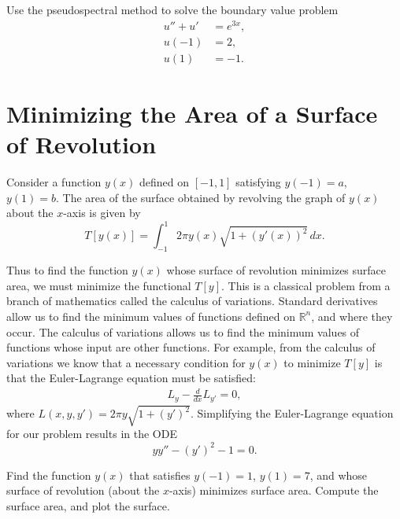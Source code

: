 \begin{problem}
Use the pseudospectral method to solve the boundary value problem 
\begin{align*}
u'' + u' &= e^{3x}, \\
u(-1) &= 2, \\
u(1) &= -1.
\end{align*}
	
\end{problem}





\section*{Minimizing the Area of a Surface of Revolution}
Consider a function $y(x)$ defined on $[-1,1]$ satisfying $y(-1) = a $, $y(1) = b. $ The area of the surface obtained by revolving the graph of $y(x)$ about the $x$-axis is given by 
\[T[y(x)] = \int_{-1}^1 2 \pi y(x) \sqrt{1 + (y'(x))^2}\, dx .\]

Thus to find the function $y(x)$ whose surface of revolution minimizes surface area, we must minimize the functional $T[y]$. 
This is a classical problem from a branch of mathematics called the calculus of variations. 
Standard derivatives allow us to find the minimum values of functions defined on $\mathbb{R}^n$, and where they occur. 
The calculus of variations allows us to find the minimum values of functions whose input are other functions. For example, from the calculus of variations we know that a necessary condition for $y(x)$ to minimize $T[y]$ is that the Euler-Lagrange equation must be satisfied: 
\begin{align*}
	L_y - \frac{d}{dx}L_{y'} = 0,
\end{align*}
where $L(x,y,y') = 2 \pi y \sqrt{1 + (y')^2}$.  Simplifying the Euler-Lagrange equation for our problem results in the ODE
\[y y'' - (y')^2 -1 = 0.\]


\begin{problem}
	Find the function $y(x)$ that satisfies $y(-1) = 1$, $y(1) = 7$, and whose surface of revolution (about the $x$-axis) minimizes surface area. Compute the surface area, and plot the surface. \label{prob:pseudospectral1_revision:minimal_surface}
\end{problem}

